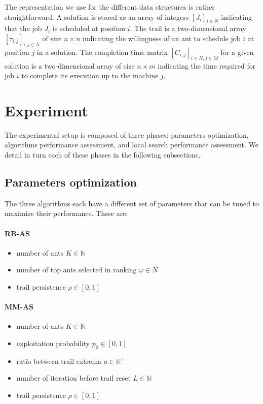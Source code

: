 \documentclass[runningheads]{llncs}
\begin{document}
The representation we use for the different data structures is rather
straightforward. A solution is stored as an array of integers $[J_i]_{i\in N}$
indicating that the job $J_i$ is scheduled at position $i$. The trail is a
two-dimensional array $[\tau_{i,j}]_{i,j\in N}$ of size $n\times n$ indicating
the willingness of an ant to schedule job $i$ at position $j$ in a solution. The
completion time matrix $[C_{i,j}]_{i\in N, j\in M}$ for a given solution is a
two-dimensional array of size $n\times m$ indicating the time required for job
$i$ to complete its execution up to the machine $j$.

\section{Experiment}
\label{sec:exp}

The experimental setup is composed of three phases: parameters optimization,
algorithms performance assessment, and local search performance assessment.
We detail in turn each of these phases in the following subsections.

\subsection{Parameters optimization}

The three algorithms each have a different set of parameters that can be tuned
to maximize their performance. These are:

\paragraph{RB-AS}
\begin{itemize}
	\item number of ants $K\in\mathbb{N}$
	\item number of top ants selected in ranking $\omega\in N$
	\item trail persistence $\rho\in[0,1]$
\end{itemize}

\paragraph{MM-AS}
\begin{itemize}
	\item number of ants $K\in\mathbb{N}$
	\item exploitation probability $p_0\in[0,1]$
	\item ratio between trail extrema $a\in\mathbb{R^+}$
	\item number of iteration before trail reset $L\in\mathbb{N}$
	\item trail persistence $\rho\in[0,1]$
\end{itemize}
\end{document}
